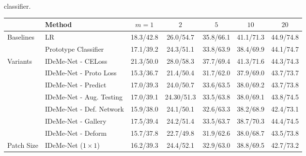 \documentclass[10pt,letterpaper,twocolumn]{article}
\providecommand{\tabularnewline}{\\}
\begin{document}
classifier.\begin{table*}
\begin{centering}
\begin{tabular}{llccccc}
\hline 
 & {\small{}{}{}{}{}{}Method  } & {\small{}{}{}{}{}{}$m=1$  } & {\small{}{}{}{}{}{}$2$  } & {\small{}{}{}{}{}{}$5$  } & {\small{}{}{}{}{}{}$10$  } & {\small{}{}{}{}{}{}$20$ }\tabularnewline
\hline 
\hline 
\multirow{2}{*}{{\small{}Baselines }} & {\small{}{}{}{}{}{}LR  } & {\small{}{}{}{}{}{}18.3/42.8  } & {\small{}{}{}{}{}{}26.0/54.7  } & {\small{}{}{}{}{}{}35.8/66.1  } & {\small{}{}{}{}{}{}41.1/71.3  } & {\small{}{}{}{}{}{}44.9/74.8 }\tabularnewline
 & {\small{}{}{}{}{}{}Prototype Classifier  } & {\small{}{}{}{}{}{}17.1/39.2  } & {\small{}{}{}{}{}{}24.3/51.1  } & {\small{}{}{}{}{}{}33.8/63.9  } & {\small{}{}{}{}{}{}38.4/69.9  } & {\small{}{}{}{}{}{}44.1/74.7 }\tabularnewline
\hline 
\multirow{7}{*}{{\small{}Variants }} & {\small{}{}{}{}{}{}IDeMe-Net - CELoss  } & {\small{}{}{}{}{}{}21.3/50.0  } & {\small{}{}{}{}{}{}28.0/58.3  } & {\small{}{}{}{}{}{}37.7/69.4  } & {\small{}{}{}{}{}{}41.3/71.6  } & {\small{}{}{}{}{}{}44.3/74.3 }\tabularnewline
 & {\small{}{}{}{}{}IDeMe-Net - Proto Loss  } & {\small{}{}{}{}{}{}15.3/36.7  } & {\small{}{}{}{}{}{}21.4/50.4  } & {\small{}{}{}{}{}{}31.7/62.0  } & {\small{}{}{}{}{}{}37.9/69.0  } & {\small{}{}{}{}{}{}43.7/73.7}\tabularnewline
 & {\small{}{}{}{}{}{}IDeMe-Net - Predict
 } & {\small{}{}{}{}{}{}17.0/39.3  } & {\small{}{}{}{}{}{}24.0/50.7  } & {\small{}{}{}{}{}{}33.6/63.5  } & {\small{}{}{}{}{}{}38.0/69.2  } & {\small{}{}{}{}{}{}43.7/73.8 }\tabularnewline
 & {\small{}{}{}{}{}{}IDeMe-Net - Aug. Testing  } & {\small{}{}{}{}{}{}17.0/39.1  } & {\small{}{}{}{}{}{}24.30/51.3  } & {\small{}{}{}{}{}{}33.5/63.8  } & {\small{}{}{}{}{}{}38.0/69.1  } & {\small{}{}{}{}{}{}43.8/74.5 }\tabularnewline
 & {\small{}{}{}{}{}{}IDeMe-Net - Def. Network  } & {\small{}{}{}{}{}{}15.9/38.0  } & {\small{}{}{}{}{}{}24.1/50.1  } & {\small{}{}{}{}{}{}32.6/63.3  } & {\small{}{}{}{}{}{}38.2/68.9  } & {\small{}{}{}{}{}{}42.4/73.1 }\tabularnewline
 & {\small{}{}{}{}{}IDeMe-Net - Gallery  } & {\small{}{}{}{}{}17.5/39.4  } & {\small{}{}{}{}{}24.2/51.4  } & {\small{}{}{}{}{}33.5/63.7  } & {\small{}{}{}{}{}38.7/70.3  } & {\small{}{}{}{}{}44.4/74.5 }\tabularnewline
 & {\small{}{}{}{}{}IDeMe-Net - Deform  } & {\small{}{}{}{}{}15.7/37.8  } & {\small{}{}{}{}{}22.7/49.8  } & {\small{}{}{}{}{}31.9/62.6  } & {\small{}{}{}{}{}38.0/68.7  } & {\small{}{}{}{}{}43.5/73.8}\tabularnewline
\hline 
\multirow{5}{*}{{\small{}Patch Size }} 
& {\small{}{}{}{}{}{}IDeMe-Net ($1\times1$)  } & {\small{}{}{}{}{}{}16.2/39.3  } & {\small{}{}{}{}{}{}24.4/52.1  } & {\small{}{}{}{}{}{}32.9/63.0  } & {\small{}{}{}{}{}{}38.8/69.5  } & {\small{}{}{}{}{}{}42.7/73.2 }\tabularnewline

\end{tabular}
\end{centering}
\end{table*}
\end{document}
